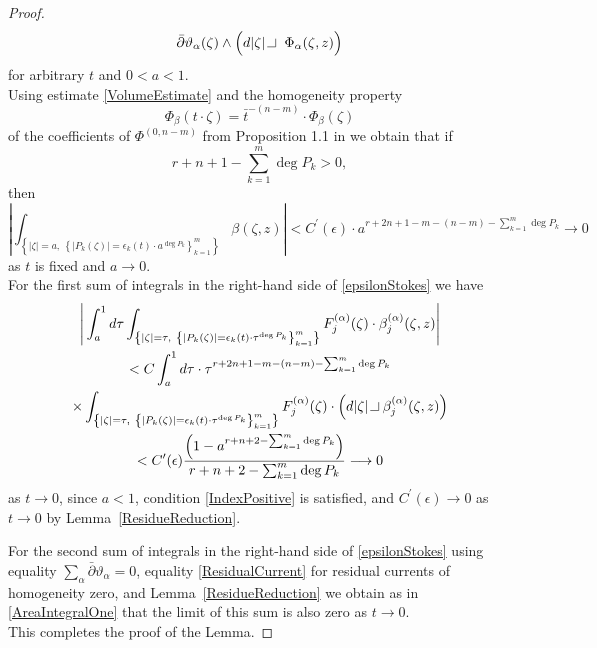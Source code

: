 \documentclass[11pt,reqno]{amsart}
\numberwithin{equation}{section}
\begin{document}
\begin{proof}
\begin{multline}
\bar\partial\vartheta_{\alpha}(\zeta)\wedge\Big(d|\zeta|{\hspace{0.02in}
\begin{picture}(6,6)
\put (0,0){\line(1,0){6}}
\put (6,0){\line(0,1){6}}
\end{picture} \hspace{0.04in}}\ \Phi_{\alpha}(\zeta,z)\Big)
\end{multline}
for arbitrary $t$ and $0<a<1$.\\
\indent
Using estimate \eqref{VolumeEstimate} and the homogeneity property
\begin{equation}\label{PhiHomogeneity}
\Phi_{\beta}(t\cdot\zeta)={\bar t}^{-(n-m)}\cdot\Phi_{\beta}(\zeta)
\end{equation}
of the coefficients of $\Phi^{(0,n-m)}$ from Proposition 1.1 in \cite{HP1} we obtain that if
\begin{equation}\label{IndexPositive}
r+n+1-\sum_{k=1}^m\deg P_k >0,
\end{equation}
then
\begin{equation*}
\left|\int_{\left\{|\zeta|= a,\
\left\{|P_k(\zeta)|=\epsilon_k(t)\cdot a^{\deg P_k}\right\}_{k=1}^m\right\}}
\beta(\zeta,z)\right|
<C^{\prime}(\epsilon)\cdot a^{r+2n+1-m-(n-m)-\sum_{k=1}^m\deg P_k}\longrightarrow 0
\end{equation*}
as $t$ is fixed and $a\to 0$.\\
\indent
For the first sum of integrals in the right-hand side of \eqref{epsilonStokes} we have
\begin{multline}\label{AreaIntegralOne}
\Bigg|\int_{ a}^1d\tau\int_{\left\{|\zeta|=\tau,\
\left\{|P_k(\zeta)|=\epsilon_k(t)\cdot\tau^{\deg P_k}\right\}_{k=1}^m\right\}}
F^{(\alpha)}_j(\zeta)\cdot\beta_j^{(\alpha)}(\zeta,z)\Bigg|\\
<C\int_{ a}^1d\tau\cdot\tau^{r+2n+1-m-(n-m)-\sum_{k=1}^m\deg P_k}\\
\times\int_{\left\{|\zeta|=\tau,\
\left\{|P_k(\zeta)|=\epsilon_k(t)\cdot\tau^{\deg P_k}\right\}_{k=1}^m\right\}}
F^{(\alpha)}_j(\zeta)\cdot\left(d|\zeta|{\hspace{0.02in}
\begin{picture}(6,6)
\put (0,0){\line(1,0){6}}
\put (6,0){\line(0,1){6}}
\end{picture} \hspace{0.04in}}\beta_j^{(\alpha)}(\zeta,z)\right)\\
<C^{\prime}(\epsilon)\frac{\left(1- a^{r+n+2-\sum_{k=1}^m\deg P_k}\right)}
{r+n+2-\sum_{k=1}^m\deg P_k}\longrightarrow 0
\end{multline}
as $t\to 0$, since $a<1$, condition \eqref{IndexPositive} is satisfied,
and $C^{\prime}(\epsilon)\to 0$ as $t\to 0$ by Lemma~\ref{ResidueReduction}.

\indent
For the second sum of integrals in the right-hand side of \eqref{epsilonStokes}
using equality $\sum_{\alpha}\bar\partial\vartheta_{\alpha}=0$, equality \eqref{ResidualCurrent}
for residual currents of homogeneity zero, and Lemma~\ref{ResidueReduction} we obtain
as in \eqref{AreaIntegralOne} that the limit of this sum is also zero as $t\to 0$.\\
\indent
This completes the proof of the Lemma.
\end{proof}
\end{document}
